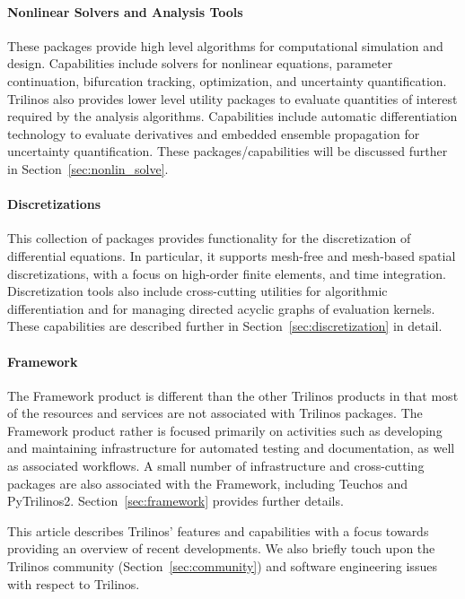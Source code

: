 \paragraph{Nonlinear Solvers and Analysis Tools} These packages provide high level algorithms for computational simulation and design. Capabilities include solvers for nonlinear equations, parameter continuation, bifurcation tracking, optimization, and uncertainty quantification. Trilinos also provides lower level utility packages to evaluate quantities of interest required by the analysis algorithms. Capabilities include automatic differentiation technology to evaluate derivatives and embedded ensemble propagation for uncertainty quantification. These packages/capabilities will be discussed further in Section~\ref{sec:nonlin_solve}.

\paragraph{Discretizations} This collection of packages provides functionality for the discretization of differential equations. In particular, it supports mesh-free and mesh-based spatial discretizations, with a focus on high-order finite elements, and time integration. Discretization tools also include cross-cutting utilities for algorithmic differentiation and for managing directed acyclic graphs of evaluation kernels. These capabilities are described further in Section~\ref{sec:discretization} in detail.

\paragraph{Framework} The Framework product is different than the other Trilinos products in that most of the resources and services are not associated with Trilinos packages. The Framework product rather is focused primarily on activities such as developing and maintaining infrastructure for automated testing and documentation, as well as associated workflows. A small number of infrastructure and cross-cutting packages are also associated with the Framework, including Teuchos and PyTrilinos2. Section~\ref{sec:framework} provides further details.


This article describes Trilinos' features and capabilities with a focus towards providing an overview of recent developments. We also briefly touch upon the Trilinos community (Section~\ref{sec:community}) and software engineering issues with respect to Trilinos.
